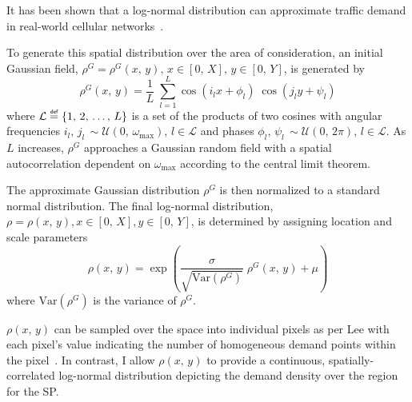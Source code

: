 \documentclass[12pt,dvipsnames]{report}
\newcommand\defeq{\mathrel{\overset{\makebox[0pt]{\mbox{\normalfont\tiny\sffamily def}}}{=}}}
\begin{document}
%
It has been shown that a log-normal distribution can approximate traffic demand in real-world cellular networks~\cite{686105, 5936263}.  

%
To generate this spatial distribution over the area of consideration, an initial Gaussian field, $\rho^G = \rho^G\left(x,\, y\right),\, x \in \left[0,\, X\right],\, y \in \left[0,\, Y\right]$, is generated by
\begin{equation}
\rho^G\left(x,\, y\right)=\frac{1}{L} \; \sum_{l=1}^L \cos\left(i_lx+\phi_l\right) \; \cos\left(j_ly+\psi_l\right)
\end{equation} \label{eq:rhoG}
\noindent where $\mathcal{L} \defeq \left\{1,\, 2,\, \ldots,\, L\right\}$ is a set of the products of two cosines with angular frequencies $i_l,\, j_l\, \sim \mathcal{U}\left(0,\, \omega_{\max}\right),\, l \in \mathcal{L}$ and phases $\phi_l,\, \psi_l\, \sim \mathcal{U}\left(0,\, 2\pi\right),\, l \in \mathcal{L}$.  As $L$ increases, $\rho^G$ approaches a Gaussian random field with a spatial autocorrelation dependent on $\omega_{\max}$ according to the central limit theorem.

%
The approximate Gaussian distribution $\rho^G$ is then normalized to a standard normal distribution.  The final log-normal distribution, $\rho = \rho\left(x,\, y\right), x \in [0,\, X], y \in [0,\, Y]$, is determined by assigning location and scale parameters
\begin{equation}
\rho\left(x,\, y\right) = \exp\left(\frac{\sigma}{\sqrt{\text{Var}\left(\rho^G\right)}} \; \rho^G\left(x,\, y\right)+\mu\right)
\end{equation} \label{eq:rhoLN}
\noindent where $\text{Var}\left(\rho^G\right)$ is the variance of $\rho^G$.

%
$\rho\left(x,\, y\right)$ can be sampled over the space into individual pixels as per Lee with each pixel's value indicating the number of homogeneous demand points within the pixel~\cite{6554749}.  In contrast, I allow $\rho\left(x,\, y\right)$ to provide a continuous, spatially-correlated log-normal distribution depicting the demand density over the region for the SP.
\end{document}
